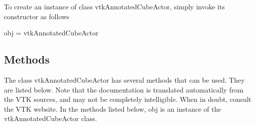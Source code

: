 To create an instance of class vtk\-Annotated\-Cube\-Actor, simply invoke its constructor as follows \begin{DoxyVerb}  obj = vtkAnnotatedCubeActor
\end{DoxyVerb}
 \hypertarget{vtkwidgets_vtkxyplotwidget_Methods}{}\subsection{Methods}\label{vtkwidgets_vtkxyplotwidget_Methods}
The class vtk\-Annotated\-Cube\-Actor has several methods that can be used. They are listed below. Note that the documentation is translated automatically from the V\-T\-K sources, and may not be completely intelligible. When in doubt, consult the V\-T\-K website. In the methods listed below, {\ttfamily obj} is an instance of the vtk\-Annotated\-Cube\-Actor class. 
